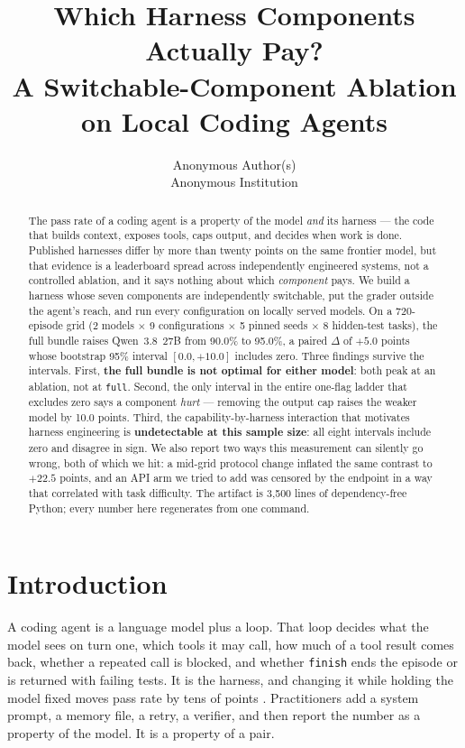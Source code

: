 \documentclass[10pt]{article}
\title{Which Harness Components Actually Pay?\\
A Switchable-Component Ablation on Local Coding Agents}
\author{Anonymous Author(s)\\Anonymous Institution}
\date{}
\begin{document}
\maketitle

\begin{abstract}
The pass rate of a coding agent is a property of the model \emph{and} its harness --- the
code that builds context, exposes tools, caps output, and decides when work is done.
Published harnesses differ by more than twenty points on the same frontier model, but that
evidence is a leaderboard spread across independently engineered systems, not a controlled
ablation, and it says nothing about which \emph{component} pays. We build a harness whose
seven components are independently switchable, put the grader outside the agent's reach, and
run every configuration on locally served models. On a 720-episode grid (2 models $\times$ 9
configurations $\times$ 5 pinned seeds $\times$ 8 hidden-test tasks), the full bundle raises
Qwen~3.8~27B from 90.0\% to 95.0\%, a paired $\Delta$ of $+5.0$ points whose bootstrap 95\%
interval $[0.0, +10.0]$ includes zero. Three findings survive the intervals. First,
\textbf{the full bundle is not optimal for either model}: both peak at an ablation, not at
\texttt{full}. Second, the only interval in the entire one-flag ladder that excludes zero says
a component \emph{hurt} --- removing the output cap raises the weaker model by 10.0 points.
Third, the capability-by-harness interaction that motivates harness engineering is
\textbf{undetectable at this sample size}: all eight intervals include zero and disagree in
sign. We also report two ways this measurement can silently go wrong, both of which we hit: a
mid-grid protocol change inflated the same contrast to $+22.5$ points, and an API arm we tried
to add was censored by the endpoint in a way that correlated with task difficulty. The
artifact is 3{,}500 lines of dependency-free Python; every number here regenerates from one
command.
\end{abstract}

\section{Introduction}

A coding agent is a language model plus a loop. That loop decides what the model sees on turn
one, which tools it may call, how much of a tool result comes back, whether a repeated call is
blocked, and whether \texttt{finish} ends the episode or is returned with failing tests. It is
the harness, and changing it while holding the model fixed moves pass rate by tens of points
\citep{metaharness,terminalbench}. Practitioners add a system prompt, a memory file, a retry, a
verifier, and then report the number as a property of the model. It is a property of a pair.
\end{document}
